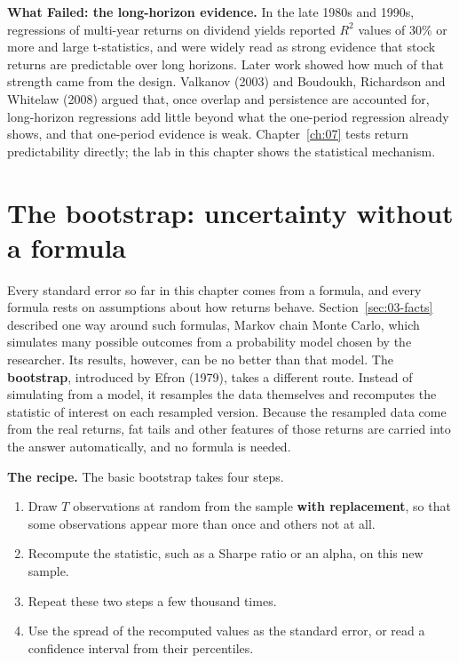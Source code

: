 \begin{callout}
\textbf{What Failed: the long-horizon evidence.} In the late 1980s and 1990s, regressions of multi-year returns on dividend yields reported $R^2$ values of 30\% or more and large t-statistics, and were widely read as strong evidence that stock returns are predictable over long horizons. Later work showed how much of that strength came from the design. Valkanov (2003) and Boudoukh, Richardson and Whitelaw (2008) argued that, once overlap and persistence are accounted for, long-horizon regressions add little beyond what the one-period regression already shows, and that one-period evidence is weak. Chapter~\ref{ch:07} tests return predictability directly; the lab in this chapter shows the statistical mechanism.
\end{callout}

\section{The bootstrap: uncertainty without a formula}
\label{sec:03-bootstrap}

Every standard error so far in this chapter comes from a formula, and every formula rests on assumptions about how returns behave. Section~\ref{sec:03-facts} described one way around such formulas, Markov chain Monte Carlo, which simulates many possible outcomes from a probability model chosen by the researcher. Its results, however, can be no better than that model. The \textbf{bootstrap}, introduced by Efron (1979), takes a different route. Instead of simulating from a model, it resamples the data themselves and recomputes the statistic of interest on each resampled version. Because the resampled data come from the real returns, fat tails and other features of those returns are carried into the answer automatically, and no formula is needed.

\textbf{The recipe.} The basic bootstrap takes four steps.

\begin{enumerate}
  \item Draw $T$ observations at random from the sample \textbf{with replacement}, so that some observations appear more than once and others not at all.
  \item Recompute the statistic, such as a Sharpe ratio or an alpha, on this new sample.
  \item Repeat these two steps a few thousand times.
  \item Use the spread of the recomputed values as the standard error, or read a confidence interval from their percentiles.
\end{enumerate}

